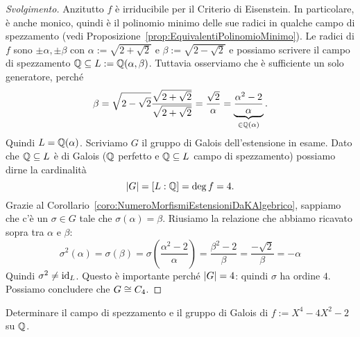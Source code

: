 \begin{proof}[Svolgimento]
Anzitutto \(f\) è irriducibile per il Criterio di Eisenstein. In particolare, è anche monico, quindi è il polinomio minimo delle sue radici in qualche campo di spezzamento (vedi Proposizione~\ref{prop:EquivalentiPolinomioMinimo}). Le radici di \(f\) sono \(\pm\alpha,\pm\beta\) con \(\alpha := \sqrt{2+\sqrt{2}}\) e \(\beta := \sqrt{2-\sqrt{2}}\) e possiamo scrivere il campo di spezzamento \(\mathbb{Q} \subseteq L := \mathbb{Q}(\alpha,\beta)\). Tuttavia osserviamo che è sufficiente un solo generatore, perché
\[\beta = \sqrt{2-\sqrt2} \frac{\sqrt{2+\sqrt2}}{\sqrt{2+\sqrt2}} = \frac{\sqrt2}{\alpha} = \underbrace{\frac{\alpha^2-2}{\alpha}}_{\in \Q(\alpha)} .\]
Quindi \(L = \mathbb{Q}(\alpha)\). Scriviamo \(G\) il gruppo di Galois dell'estensione in esame. Dato che \(\mathbb{Q} \subseteq L\) è di Galois (\(\mathbb{Q}\) perfetto e \(\mathbb{Q} \subseteq L\) campo di spezzamento) possiamo dirne la cardinalità
\[\left\lvert G\right\rvert = [L:\mathbb{Q}] = \deg f = 4 .\]
Grazie al Corollario~\ref{coro:NumeroMorfismiEstensioniDaKAlgebrico}, sappiamo che c'è un \(\sigma \in G\) tale che \(\sigma(\alpha) = \beta\). Riusiamo la relazione che abbiamo ricavato sopra tra \(\alpha\) e \(\beta\):
\[
\sigma^2(\alpha)=\sigma(\beta)=\sigma\left(\frac{\alpha^2-2}{\alpha}\right)=\frac{\beta^2-2}{\beta}=\frac{-\sqrt{2}}{\beta}=-\alpha
\]
Quindi \(\sigma^2 \ne \mathrm{id}_L\). Questo è importante perché \(\left\lvert G\right\rvert = 4\): quindi \(\sigma\) ha ordine \(4\). Possiamo concludere che \(G \cong C_4\).
\end{proof}

\begin{eser}
Determinare il campo di spezzamento e il gruppo di Galois di \(f := X^4-4X^2-2\) su \(\mathbb{Q}\).
\end{eser}

